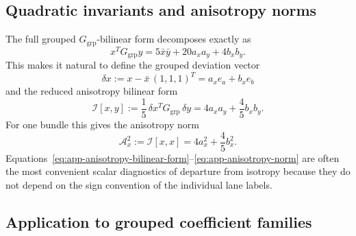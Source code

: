 \documentclass[11pt]{article}
\theoremstyle{definition}
\begin{document}
\subsection{Quadratic invariants and anisotropy norms}

The full grouped $G_{\mathrm{grp}}$-bilinear form decomposes exactly as
\begin{equation}
 x^T G_{\mathrm{grp}} y = 5\bar x\bar y + 20 a_x a_y + 4 b_x b_y.
 \label{eq:app-grouped-bilinear-form}
\end{equation}
This makes it natural to define the grouped deviation vector
\begin{equation}
 \delta x:=x-\bar x\,(1,1,1)^T = a_x e_a+b_x e_b
 \label{eq:app-grouped-deviation}
\end{equation}
and the reduced anisotropy bilinear form
\begin{equation}
 \mathcal I[x,y]
 :=
 \frac15\,\delta x^T G_{\mathrm{grp}}\,\delta y
 =
 4a_x a_y+\frac45 b_x b_y.
 \label{eq:app-anisotropy-bilinear-form}
\end{equation}
For one bundle this gives the anisotropy norm
\begin{equation}
 \mathcal A_x^2:=\mathcal I[x,x]=4a_x^2+\frac45 b_x^2.
 \label{eq:app-anisotropy-norm}
\end{equation}
Equations~\eqref{eq:app-anisotropy-bilinear-form}--\eqref{eq:app-anisotropy-norm} are often the most convenient scalar diagnostics of departure from isotropy because they do not depend on the sign convention of the individual lane labels.

\subsection{Application to grouped coefficient families}
\end{document}
